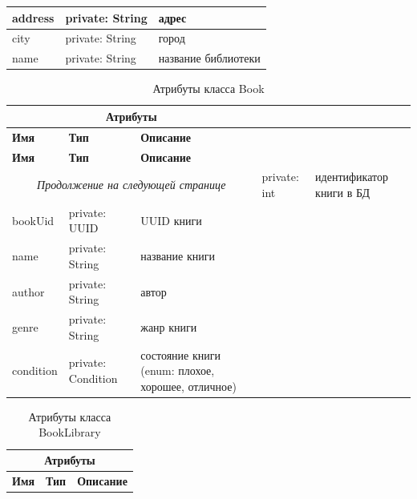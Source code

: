 \documentclass[a4paper, 12pt]{article}
\begin{document}
\begin{large}
\begin{longtable}{| p{3cm} | p{5cm} | p{8cm} |}
	address
	&
	private: String
	&
	адрес \\
	\hline

	city
	&
	private: String
	&
	город \\
	\hline
	
	name
	&
	private: String
	&
	название библиотеки \\
\end{longtable}

\begin{longtable}{| p{3cm} | p{5cm} | p{8cm} |}
	\caption{Атрибуты класса Book}
	\label{tbl:abonement} \\
	\hline
	
	\multicolumn{3}{|c|}{\textbf{Атрибуты}} \\
	\hline
	
	\textbf{Имя} & \textbf{Тип} & \textbf{Описание} \\
	\hline
	\endfirsthead
	
	\hline
	\textbf{Имя} & \textbf{Тип} & \textbf{Описание} \\
	\hline
	\endhead
	
	\hline
	\multicolumn{3}{c}{\textit{Продолжение на следующей странице}}
	\endfoot
	\hline
	\endlastfoot
	
	id
	&
	private: int
	&
	идентификатор книги в БД \\
	\hline
	
	bookUid
	&
	private: UUID
	&
	UUID книги \\
	\hline
	
	name
	&
	private: String
	&
	название книги \\
	\hline
	
	author
	&
	private: String
	&
	автор \\
	\hline
	
	genre
	&
	private: String
	&
	жанр книги \\
	\hline
	
	condition
	&
	private: Condition
	&
	состояние книги (enum: плохое, хорошее, отличное) \\
\end{longtable}

\begin{longtable}{| p{3cm} | p{5cm} | p{8cm} |}
	\caption{Атрибуты класса BookLibrary}
	\label{tbl:registered} \\
	\hline
	
	\multicolumn{3}{|c|}{\textbf{Атрибуты}} \\
	\hline
	
	\textbf{Имя} & \textbf{Тип} & \textbf{Описание} \\
	\hline
	\endfirsthead
	

\end{longtable}
\end{large}
\end{document}
